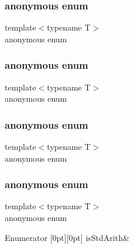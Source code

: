 \mbox{\label{classUtil_1_1TypeTraits_afc149b944bb7e7a0af2b4e1a36f11b8c}} 
\subsubsection{\texorpdfstring{anonymous enum}{anonymous enum}}
{\footnotesize\ttfamily template$<$typename T$>$ \\
anonymous enum}

\mbox{\label{classUtil_1_1TypeTraits_a1710cebabd1aa98a60f7695ed20ac1e3}} 
\subsubsection{\texorpdfstring{anonymous enum}{anonymous enum}}
{\footnotesize\ttfamily template$<$typename T$>$ \\
anonymous enum}

\mbox{\label{classUtil_1_1TypeTraits_ad11eac08964b11f7e285c09d22a1168a}} 
\subsubsection{\texorpdfstring{anonymous enum}{anonymous enum}}
{\footnotesize\ttfamily template$<$typename T$>$ \\
anonymous enum}

\mbox{\label{classUtil_1_1TypeTraits_a1cfd1423cce5a0b762ee8f5c9c2f004e}} 
\subsubsection{\texorpdfstring{anonymous enum}{anonymous enum}}
{\footnotesize\ttfamily template$<$typename T$>$ \\
anonymous enum}

\begin{DoxyEnumFields}{Enumerator}
[0pt][0pt]{}\mbox{\label{classUtil_1_1TypeTraits_a1cfd1423cce5a0b762ee8f5c9c2f004ea3017f19abc6084d7e144891aaf5adb0f}} 
is\+Std\+Arith&\\
\hline

\end{DoxyEnumFields}
\mbox{\label{classUtil_1_1TypeTraits_ad2a782274bd24165717b068f49fd6851}} 

